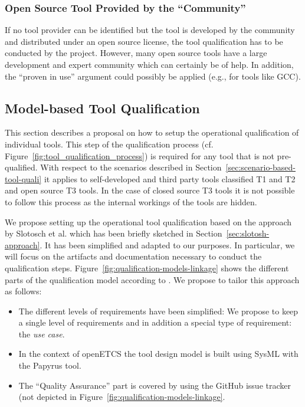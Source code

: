 \subsubsection{Open Source Tool Provided by the ``Community''}

If no tool provider can be identified but the tool is developed by the community and distributed under an open source license, the tool qualification has to be conducted by the project. However, many open source tools have a large development and expert community which can certainly be of help. In addition, the ``proven in use'' argument could possibly be applied (e.g., for tools like GCC).

\subsection{Model-based Tool Qualification}
\label{sec:model-based-tool-quali}

This section describes a proposal on how to setup the operational qualification of individual tools. This step of the qualification process (cf. Figure~\ref{fig:tool_qualification_process}) is required for any tool that is not pre-qualified. With respect to the scenarios described in Section~\ref{sec:scenario-based-tool-quali} it applies to self-developed and third party tools classified T1 and T2 and open source T3 tools. In the case of closed source T3 tools it is not possible to follow this process as the internal workings of the tools are hidden.

We propose setting up the operational tool qualification based on the approach by Slotosch et al. which has been briefly sketched in Section~\ref{sec:slotosh-approach}. It has been simplified and adapted to our purposes. In particular, we will focus on the artifacts and documentation necessary to conduct the qualification steps. Figure~\ref{fig:qualification-models-linkage} shows the different parts of the qualification model according to \cite{slotosch_model-based_2012}. We propose to tailor this approach as follows:
\begin{itemize}
    \item The different levels of requirements have been simplified: We propose to keep a single level of requirements and in addition a special type of requirement: the \emph{use case}.
    \item In the context of openETCS the tool design model is built using SysML with the Papyrus tool.
	\item The ``Quality Assurance'' part is covered by using the GitHub issue tracker (not depicted in Figure~\ref{fig:qualification-models-linkage}.
\end{itemize}

